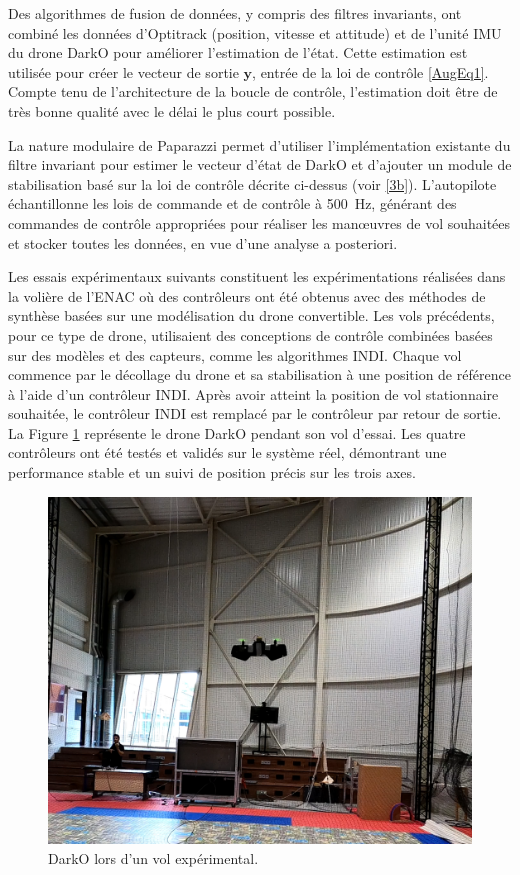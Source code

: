 Des algorithmes de fusion de données, y compris des filtres invariants, ont combiné les données d'Optitrack (position, vitesse et attitude) et de l'unité IMU du drone DarkO pour améliorer l'estimation de l'état. Cette estimation est utilisée pour créer le vecteur de sortie $\boldsymbol{y}$, entrée de la loi de contrôle \eqref{AugEq1}. Compte tenu de l'architecture de la boucle de contrôle, l'estimation doit être de très bonne qualité avec le délai le plus court possible.

La nature modulaire de Paparazzi permet d'utiliser l'implémentation existante du filtre invariant pour estimer le vecteur d'état de DarkO et d'ajouter un module de stabilisation basé sur la loi de contrôle décrite ci-dessus (voir \ref{3b}). L'autopilote échantillonne les lois de commande et de contrôle à \SI{500}{\hertz}, générant des commandes de contrôle appropriées pour réaliser les manœuvres de vol souhaitées et stocker toutes les données, en vue d'une analyse a posteriori.

Les essais expérimentaux suivants constituent les expérimentations réalisées dans la volière de l'ENAC où des contrôleurs ont été obtenus avec des méthodes de synthèse basées sur une modélisation du drone convertible. Les vols précédents, pour ce type de drone, utilisaient des conceptions de contrôle combinées basées sur des modèles et des capteurs, comme les algorithmes INDI. Chaque vol commence par le décollage du drone et sa stabilisation à une position de référence à l'aide d'un contrôleur INDI. Après avoir atteint la position de vol stationnaire souhaitée, le contrôleur INDI est remplacé par le contrôleur par retour de sortie. La Figure \ref{DarkO2} représente le drone DarkO pendant son vol d'essai. Les quatre contrôleurs ont été testés et validés sur le système réel, démontrant une performance stable et un suivi de position précis sur les trois axes.
\begin{figure}[H]
    \centering
    \includegraphics[trim=0cm 1cm 0cm 6cm,clip,width=0.6\columnwidth]{figures/DarkOFlighthope.png}
    \caption{DarkO lors d'un vol expérimental.}
    \label{DarkO2}
\end{figure}

